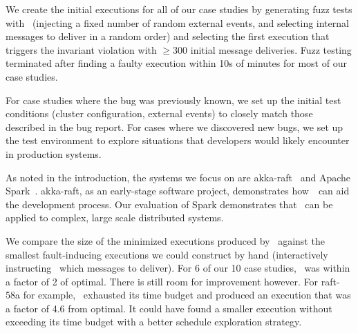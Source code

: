 We create the initial executions for all of our case studies by generating fuzz tests with \sys~(injecting a fixed number of random external events, and selecting internal
messages to deliver in a random order)
and selecting the first execution that triggers the invariant
violation with $\geq$300 initial message deliveries.
Fuzz testing terminated after finding a faulty execution within 10s of minutes for most of our case studies.

For case studies where the bug was previously known,
we set up the initial test conditions (cluster configuration, external events) to
closely match those described in the bug report. For cases where we discovered
new bugs, we set up the test environment to explore situations that developers
would likely encounter in production systems.

As noted in the introduction, the systems we focus on are
akka-raft~\cite{akka-raft} and Apache Spark~\cite{zaharia2012resilient}.
akka-raft, as an early-stage software project, demonstrates how~\sys~can aid the development process.
Our evaluation of Spark demonstrates that \sys~can be applied to complex, large scale distributed systems.

 We compare the size of the
minimized executions produced by \sys~against the
smallest fault-inducing executions we could construct by hand (interactively
instructing \sys~which messages to deliver).
For 6 of our 10 case studies, \sys~was within a factor of 2 of optimal.
There is still room for improvement however. For raft-58a for example,
\sys~exhausted its time budget and produced an execution that was a
factor of 4.6 from optimal. It could have found a smaller execution without
exceeding its time budget with a better schedule exploration strategy.


